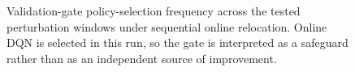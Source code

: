 \begin{figure}[t]
\centering
{}
\caption{Validation-gate policy-selection frequency across the tested perturbation windows under sequential online relocation. Online DQN is selected in this run, so the gate is interpreted as a safeguard rather than as an independent source of improvement.}
\label{fig:generated_selector_pie}
\end{figure}
